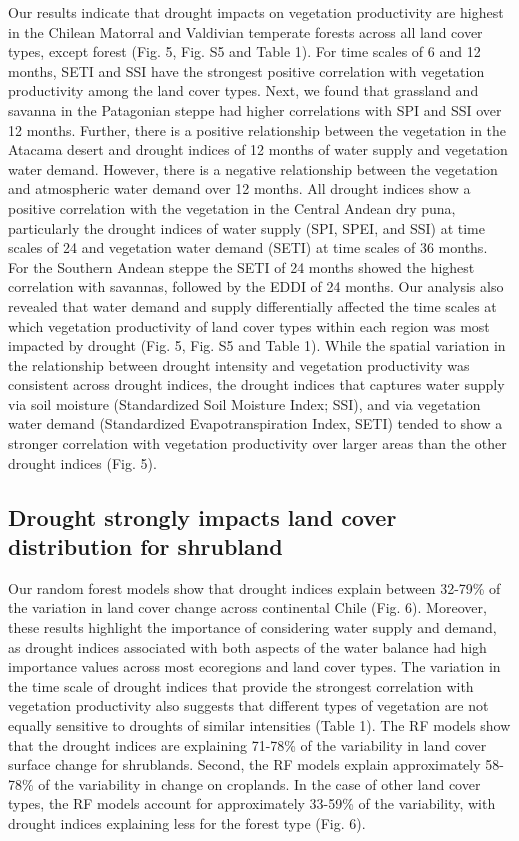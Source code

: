 \documentclass[
  sn-nature,
  numbered]{sn-jnl}
\begin{document}
Our results indicate that drought impacts on vegetation productivity are
highest in the Chilean Matorral and Valdivian temperate forests across
all land cover types, except forest (Fig. 5, Fig. S5 and Table 1). For
time scales of 6 and 12 months, SETI and SSI have the strongest positive
correlation with vegetation productivity among the land cover types.
Next, we found that grassland and savanna in the Patagonian steppe had
higher correlations with SPI and SSI over 12 months. Further, there is a
positive relationship between the vegetation in the Atacama desert and
drought indices of 12 months of water supply and vegetation water
demand. However, there is a negative relationship between the vegetation
and atmospheric water demand over 12 months. All drought indices show a
positive correlation with the vegetation in the Central Andean dry puna,
particularly the drought indices of water supply (SPI, SPEI, and SSI) at
time scales of 24 and vegetation water demand (SETI) at time scales of
36 months. For the Southern Andean steppe the SETI of 24 months showed
the highest correlation with savannas, followed by the EDDI of 24
months. Our analysis also revealed that water demand and supply
differentially affected the time scales at which vegetation productivity
of land cover types within each region was most impacted by drought
(Fig. 5, Fig. S5 and Table 1). While the spatial variation in the
relationship between drought intensity and vegetation productivity was
consistent across drought indices, the drought indices that captures
water supply via soil moisture (Standardized Soil Moisture Index; SSI),
and via vegetation water demand (Standardized Evapotranspiration Index,
SETI) tended to show a stronger correlation with vegetation productivity
over larger areas than the other drought indices (Fig. 5).

\subsection{Drought strongly impacts land cover distribution for
shrubland}\label{drought-strongly-impacts-land-cover-distribution-for-shrubland}

Our random forest models show that drought indices explain between
32-79\% of the variation in land cover change across continental Chile
(Fig. 6). Moreover, these results highlight the importance of
considering water supply and demand, as drought indices associated with
both aspects of the water balance had high importance values across most
ecoregions and land cover types. The variation in the time scale of
drought indices that provide the strongest correlation with vegetation
productivity also suggests that different types of vegetation are not
equally sensitive to droughts of similar intensities (Table 1). The RF
models show that the drought indices are explaining 71-78\% of the
variability in land cover surface change for shrublands. Second, the RF
models explain approximately 58-78\% of the variability in change on
croplands. In the case of other land cover types, the RF models account
for approximately 33-59\% of the variability, with drought indices
explaining less for the forest type (Fig. 6).
\end{document}
